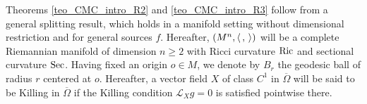 \documentclass[10 pt,a4paper]{article}
\newtheorem{theorem}[definition]{Theorem}
\theoremstyle{definition}
\begin{document}
%
%
%
%
%
%



Theorems \ref{teo_CMC_intro_R2} and \ref{teo_CMC_intro_R3} follow from a general splitting result, which holds in a manifold setting without dimensional restriction and for general sources $f$. Hereafter, $(M^n,\langle \, , \, \rangle)$ will be a complete Riemannian manifold of dimension $n \ge 2$ with Ricci curvature $\mathrm{Ric}$ and sectional curvature $\mathrm{Sec}$. Having fixed an origin $o \in M$, we denote by $B_r$ the geodesic ball of radius $r$ centered at $o$. Hereafter, a vector field $X$ of class $C^1$ in $\overline{\Omega}$ will be said to be Killing in $\overline{\Omega}$ if the Killing condition $\mathscr{L}_X g = 0$ is satisfied pointwise there. 
\end{document}
